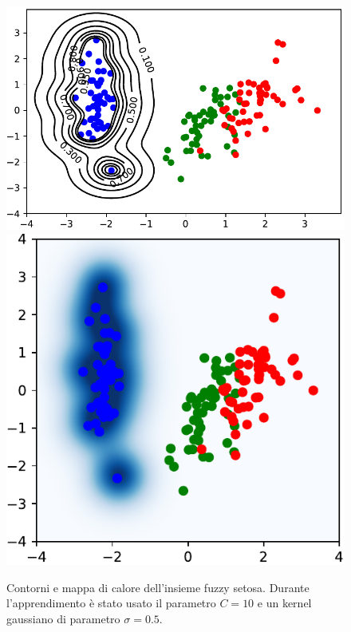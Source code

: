 \documentclass [11pt,a4paper,twoside,openright] {book}
\begin{document}
\begin{figure}[!b]
        \centering%
        \subfigure
          {\includegraphics[scale=.5]{figure/setosamap.pdf}}\qquad\qquad
       \subfigure
          {\includegraphics[scale=.5]{figure/setosaheat.pdf}}
          \caption{Contorni e mappa di calore dell'insieme fuzzy setosa. Durante l'apprendimento è stato usato il parametro $C=10$ e un kernel gaussiano di parametro $\sigma=0.5$.}
\end{figure}
\end{document}
